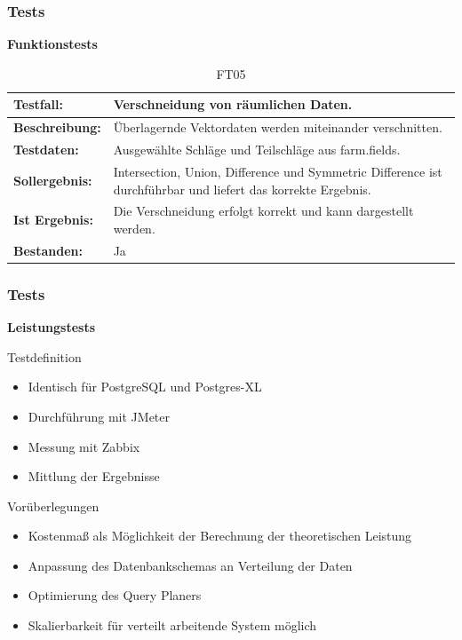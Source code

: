 \documentclass{beamer}
\begin{document}
\begin{frame}\frametitle{Tests}
\centering\textbf{Funktionstests}

\begin{table}[h!]
\centering
\small
\begin{tabular}{|p{2.3cm}|p{7cm}|}
 \hline
\textbf{Testfall:} & Verschneidung von räumlichen Daten. \\ \hline
\textbf{Beschreibung:} & Überlagernde Vektordaten werden miteinander verschnitten. \\ \hline
\textbf{Testdaten:} & Ausgewählte Schläge und Teilschläge aus farm.fields. \\ \hline
\textbf{Sollergebnis:} & Intersection, Union, Difference und Symmetric Difference ist durchführbar und liefert das korrekte Ergebnis. \\ \hline
\textbf{Ist Ergebnis:} & Die Verschneidung erfolgt korrekt und kann dargestellt werden. \\ \hline
\textbf{Bestanden:} & Ja \\ \hline
\end{tabular}
\caption{FT05}
\end{table}
\end{frame}

\begin{frame}\frametitle{Tests}
\centering\textbf{Leistungstests}

\begin{block}{Testdefinition}
\begin{itemize}
\item Identisch für PostgreSQL und Postgres-XL
\item Durchführung mit JMeter
\item Messung mit Zabbix
\item Mittlung der Ergebnisse %
\end{itemize}
\end{block}

\begin{block}{Vorüberlegungen}
\begin{itemize}
\item Kostenmaß als Möglichkeit der Berechnung der theoretischen Leistung
\item Anpassung des Datenbankschemas an Verteilung der Daten
\item Optimierung des Query Planers
\item Skalierbarkeit für verteilt arbeitende System möglich
\end{itemize}
\end{block}
\end{frame}
\end{document}
